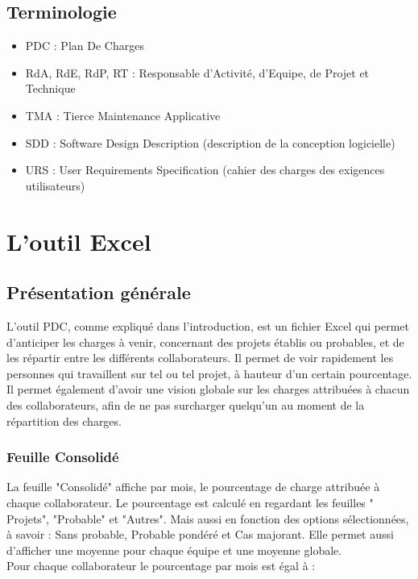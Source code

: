 \documentclass[french]{report}
\begin{document}
  \section{Terminologie}
\begin{itemize}[label=\textbullet, font=\normalfont \color{blue}]
  \item{PDC : Plan De Charges}
  \item{RdA, RdE, RdP, RT : Responsable d'Activité, d'Equipe, de Projet et Technique}
  \item{TMA : Tierce Maintenance Applicative}
  \item{SDD : Software Design Description (description de la conception logicielle)}
  \item{URS : User Requirements Specification (cahier des charges des exigences utilisateurs)}
\end{itemize}

\chapter{L'outil Excel}
  \section{Présentation générale}

L’outil PDC, comme expliqué dans l’introduction, est un fichier Excel qui permet
d’anticiper les charges à venir, concernant des projets établis ou probables, et
de les répartir entre les différents collaborateurs. Il permet de voir
rapidement les personnes qui travaillent sur tel ou tel projet, à hauteur d’un
certain pourcentage. Il permet également d’avoir une vision globale sur les
charges attribuées à chacun des collaborateurs, afin de ne pas surcharger
quelqu’un au moment de la répartition des charges.

\subsection{Feuille Consolidé}

La feuille "Consolidé" affiche par mois, le pourcentage de charge attribuée à chaque
collaborateur. Le pourcentage est calculé en regardant les feuilles "
Projets", "Probable" et "Autres". Mais aussi en fonction des options
sélectionnées, à savoir : Sans probable, Probable pondéré et Cas majorant. Elle
permet aussi d'afficher une moyenne pour chaque équipe et une moyenne globale.\\
Pour chaque collaborateur le pourcentage par mois est égal à :
\end{document}
